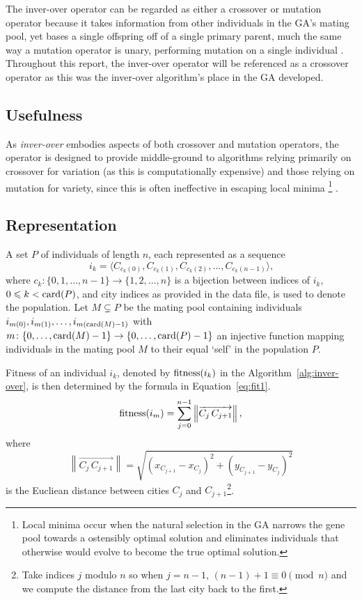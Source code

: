 The inver-over operator can be regarded as either a crossover or mutation 
operator because it takes information from other individuals in the GA's
mating pool, yet bases a single offspring off of a single primary parent, much 
the same way a mutation operator is unary, performing mutation on a single
individual \cite{p44}. Throughout this report, the inver-over operator will 
be referenced as a crossover operator as this was the inver-over 
algorithm's place in the GA developed.

\subsection{Usefulness}
As {\em inver-over} embodies aspects of both crossover and mutation 
operators, the operator  is designed to provide middle-ground to 
algorithms relying primarily on crossover for variation (as this is 
computationally expensive) and those relying on mutation for variety,
since this is often ineffective in escaping local minima%
\footnote{Local minima occur when the natural selection in the GA 
	narrows the gene pool towards a ostensibly optimal solution and 
	eliminates individuals that otherwise would evolve to become the 
	true optimal solution.} \cite{p44}.


\subsection{Representation}
A set $P$ of individuals of length $n$, each represented as a sequence
\begin{equation*}
i_k = \langle C_{c_k(0)}, C_{c_k(1)}, C_{c_k(2)}, \ldots, C_{c_k(n-1)} \rangle\text{,}
\end{equation*}
where $c_k\colon \{0, 1, \ldots, n-1\} \to \{ 1, 2, \ldots, n \}$ is a bijection 
between indices of $i_k$, $0 \leqslant k < \operatorname{card}(P)$, and city indices as 
provided in the data file, is used to denote the population. Let 
$M \subsetneq P$ be the mating pool containing individuals 
$i_{m(0)}, i_{m(1)},\ldots, i_{m(\operatorname{card}(M)-1)}$ with $m\colon 
\{0, \ldots, \operatorname{card}(M)-1\} \to \{0, \ldots, \operatorname{card}(P) -1\}$
 an injective function mapping individuals in the mating pool $M$ to 
their equal `self' in the population $P$.

Fitness of an individual $i_k$, denoted by $\operatorname{fitness}(i_k)$ in the Algorithm~\ref{alg:inver-over}, is then determined by the formula in Equation~\eqref{eq:fit1}.
\begin{equation}
\operatorname{fitness}(i_m) = \sum_{j=0}^{n-1} \left\lVert \overrightarrow{C_j \, C_{j+1}} \right\rVert, \label{eq:fit1} 
\end{equation}
where 
\begin{equation*}
\left\lVert \overrightarrow{C_j \, C_{j+1}} \right\rVert = \sqrt{(x_{C_{j+1}} - x_{C_j})^2 + (y_{C_{j+1}} - y_{C_j})^2}
\end{equation*}
is the Eucliean distance between cities $C_j$ and $C_{j+1}$\footnote{
	Take indices $j$ modulo $n$ so when $j=n-1$, $(n-1)+1  \equiv 0 \pmod n$
	 and we compute the distance from the last city back to the first.}. 

